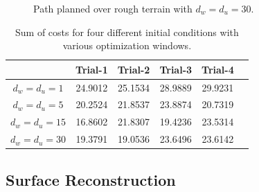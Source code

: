 				\begin{figure}
					\centering
					\caption{Path planned over rough terrain with $d_{w}=d_{u}=30$.}
					\label{fig::terrain_path_4}
				\end{figure}
				\begin{table}
					\centering
					\begin{tabularx}{\textwidth}{|C{0.25}||C{0.15}|C{0.15}|C{0.15}|C{0.15}|C{0.15}|}\hline
									& 	Trial-1		&	Trial-2 &	Trial-3 &	Trial-4 \\ \hline \hline
						$d_{w}=d_{u}=1$ 	&	24.9012		& 	25.1534	& 	28.9889	& 	29.9231	\\ \hline
						$d_{w}=d_{u}=5$ 	&	20.2524		& 	21.8537	& 	23.8874	& 	20.7319	\\ \hline
						$d_{w}=d_{u}=15$ 	&	16.8602		& 	21.8307	& 	19.4236	& 	23.5314	\\ \hline
						$d_{w}=d_{u}=30$ 	&	19.3791		& 	19.0536	& 	23.6496	& 	23.6142	\\ \hline
					\end{tabularx}
					\caption{Sum of costs for four different initial conditions with various optimization windows.}
					\label{tab::DefaultStance}
				\end{table}		


		\subsection{Surface Reconstruction}

